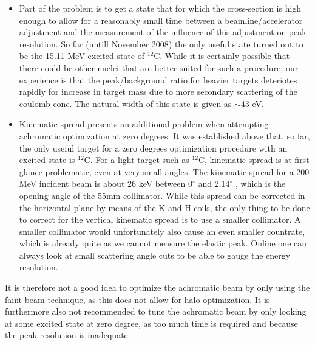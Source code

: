 \documentclass[11pt]{report}
\begin{document}
\begin{itemize}
\item Part of the problem is to get a state that for which the 
cross-section is high enough to allow for a reasonably small time
between a beamline/accelerator adjustment and the measurement of
the influence of this adjustment on peak resolution.
So far (untill November 2008) the only useful state turned out to be 
the 15.11 MeV excited state of $^{12}$C.
While it is certainly possible that there could be other nuclei that are better
suited for such a procedure, our experience is that the peak/background ratio
for heavier targets deteriotes rapidly for increase in target mass due to
more secondary scattering of the coulomb cone.
The natural width of this state is given as $\sim$43 eV.

\item Kinematic spread presents an additional problem when attempting achromatic 
optimization at zero degrees. It was established above that, so far, the only 
useful target for a zero degrees optimization procedure with an excited state is $^{12}$C.
For a light target such as  $^{12}$C, kinematic spread is at first glance problematic,
even at very small angles. The kinematic spread for a 200 MeV incident beam is  
about 26 keV between 0$^{\circ}$ and 2.14$^{\circ}$ , which
is the opening angle of the 55mm collimator. 
While this spread can be corrected in the horizontal plane
by means of the K and H coils, the only thing to be done to correct
for the vertical kinematic spread is to use a smaller collimator. A smaller collimator
would unfortunately also cause an even smaller countrate, which is already 
quite as we cannot measure the elastic peak. 
Online one can always look at small scattering angle cuts to be able to gauge the energy resolution.
\end{itemize}

\noindent It is therefore not a good idea to optimize the achromatic beam by only
using the faint beam technique, as this does not allow for halo optimization.
It is furthermore also not recommended to
tune the achromatic beam by only looking at some excited state at zero degree,
as too much time is required and because the peak resolution is inadequate.
\end{document}
